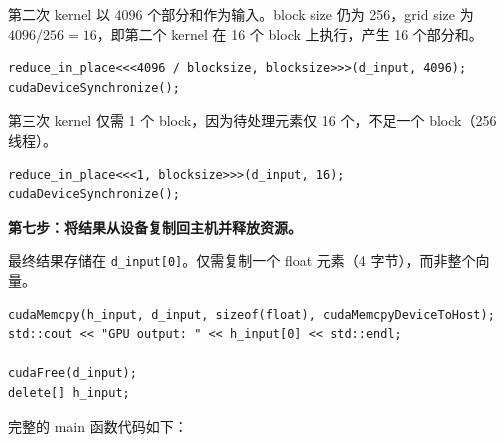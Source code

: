 第二次 kernel 以 4096 个部分和作为输入。block size 仍为 256，grid size 为 $4096 / 256 = 16$，即第二个 kernel 在 16 个 block 上执行，产生 16 个部分和。

\begin{lstlisting}
reduce_in_place<<<4096 / blocksize, blocksize>>>(d_input, 4096);
cudaDeviceSynchronize();
\end{lstlisting}

第三次 kernel 仅需 1 个 block，因为待处理元素仅 16 个，不足一个 block（256 线程）。

\begin{lstlisting}
reduce_in_place<<<1, blocksize>>>(d_input, 16);
cudaDeviceSynchronize();
\end{lstlisting}

\textbf{第七步：将结果从设备复制回主机并释放资源。}

最终结果存储在 \texttt{d\_input[0]}。仅需复制一个 float 元素（4 字节），而非整个向量。

\begin{lstlisting}
cudaMemcpy(h_input, d_input, sizeof(float), cudaMemcpyDeviceToHost);
std::cout << "GPU output: " << h_input[0] << std::endl;

cudaFree(d_input);
delete[] h_input;
\end{lstlisting}

完整的 main 函数代码如下：

